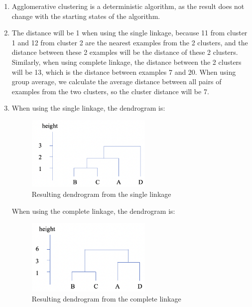 \begin{enumerate}
\item Agglomerative clustering is a deterministic algorithm, as the result does not change with the starting states of the algorithm.  \\

\item The distance will be 1 when using the single linkage, because 11 from cluster 1 and 12 from cluster 2 are the nearest examples from the 2 clusters, and the distance between these 2 examples will be the distance of these 2 clusters. Similarly, when using complete linkage, the distance between the 2 clusters will be 13, which is the distance between examples 7 and 20. When using group average, we calculate the average distance between all pairs of examples from the two clusters, so the cluster distance will be 7. \\

\item When using the single linkage, the dendrogram is:
\begin{figure}[htp]
\centering
\captionsetup{justification=centering}
\includegraphics[width=6cm]{"Part 3 - Learning Systems/Unsupervised Learning/Hierarchical Clustering/figures/AnswerQ3-single.png"}
\caption{Resulting dendrogram from the single linkage}
\label{fig:Q3-single}
\end{figure}

When using the complete linkage, the dendrogram is:
\begin{figure}[htp]
\centering
\captionsetup{justification=centering}
\includegraphics[width=6cm]{"Part 3 - Learning Systems/Unsupervised Learning/Hierarchical Clustering/figures/AnswerQ3-complete.png"}
\caption{Resulting dendrogram from the complete linkage}
\label{fig:Q3-complete}
\end{figure}


\end{enumerate}
